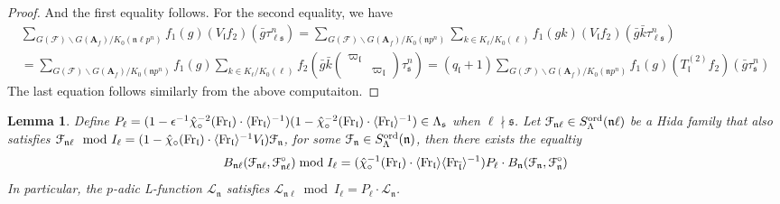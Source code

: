 \documentclass[leqno]{amsart}
\newtheorem{lem}[thm]{Lemma}
\theoremstyle{definition}
\theoremstyle{remark}
\newcommand{\smat}[1]{\left(\begin{smallmatrix} #1 \end{smallmatrix}\right)}
\newcommand{\A}{\mathbf A}
\newcommand{\Fr}{\textnormal{Fr}} %
\newcommand{\fl}{\mathfrak{l}}
\newcommand{\fn}{\mathfrak{n}}
\newcommand{\fs}{\mathfrak{s}}
\newcommand{\F}{{\mathcal{F}}} %
\newcommand{\euF}{\EuScript{F}} %
\newcommand{\ord}{\textnormal{ord}} %
\begin{document}
\begin{proof}
	And the first equality follows.
	For the second equality, we have
	\begin{multline*}
	\sum_{G(\F)\backslash G(\A_f)/K_0(\fn\ell p^n)}
	f_1(g)(V_\fl f_2)(\bar{g}\tau_{\ell\fs}^n)=
	\sum_{G(\F)\backslash G(\A_f)/K_0(\fn p^n)}
	\sum_{k\in K_\ell/K_0(\ell)}
	f_1(gk)(V_\fl f_2)(\bar{g}\bar{k}\tau_{\ell\fs}^n)\\=
	\sum_{G(\F)\backslash G(\A_f)/K_0(\fn p^n)}
	f_1(g)\sum_{k\in K_\ell/K_0(\ell)}
	f_2(\bar{g}\bar{k}\smat{\varpi_\fl&\\&\varpi_\fl}
	\tau_{\fs}^n)=
	(q_\fl+1)
	\sum_{G(\F)\backslash G(\A_f)/K_0(\fn p^n)} f_1(g)
	(T_\fl^{(2)}f_2)(\bar{g}\tau_{\fs}^n)
	\end{multline*}
	The last equation follows similarly
	from the above computaiton.
\end{proof}


\begin{lem}\label{lem:compare_L_diff_level}
Define 
$P_\ell=(1-\epsilon^{-1}\hat{\chi}_\circ^{-2}(\Fr_\fl)\cdot 
\langle \Fr_\fl\rangle^{-1})
(1-\hat{\chi}_\circ^{-2}(\Fr_\fl)\cdot 
\langle \Fr_\fl\rangle^{-1})\in \Lambda_{\fs}$
when $\ell\nmid \fs$.
Let $\euF_{\fn\ell}\in S_\Lambda^{\ord}(\fn\ell)$
be a Hida family that also satisfies
$\euF_{\fn\ell} \mod I_{\ell}=
(1-\hat{\chi}_\circ(\Fr_\fl)\cdot 
\langle \Fr_\fl\rangle^{-1} V_\fl)
\euF_{\fn}$,
for some $\euF_{\fn}\in S_\Lambda^{\ord}(\fn)$, then 
there exists the equaltiy
\[
	B_{\fn\ell}(\euF_{\fn\ell}, \euF^{\circ}_{\fn\ell})
	\bmod I_\ell=
	(\hat{\chi}_\circ^{-1}(\Fr_\fl)\cdot 
	\langle \Fr_\fl\rangle
	\langle \Fr_{\bar{\fl}}\rangle^{-1})
	P_\ell\cdot B_{\fn}(\euF_{\fn}, \euF^{\circ}_{\fn})
\]
In particular, 
the $p$-adic L-function $\mathcal{L}_\fn$ satisfies 
$\mathcal{L}_{\fn\ell} \bmod I_\ell=
P_\ell\cdot \mathcal{L}_\fn$.
\end{lem}
\end{document}
